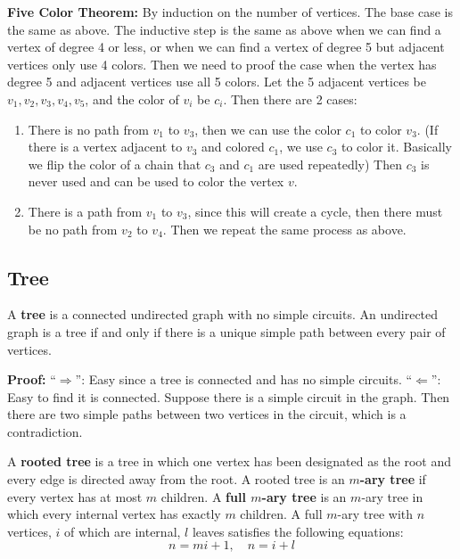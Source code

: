 \documentclass[a4paper,12pt]{article}
\begin{document}
\textbf{Five Color Theorem:}
By induction on the number of vertices.
The base case is the same as above.
The inductive step is the same as above when we can find a vertex of degree 4 or less, or when we can find a vertex of degree 5 but adjacent vertices only use 4 colors.
Then we need to proof the case when the vertex has degree 5 and adjacent vertices use all 5 colors.
Let the 5 adjacent vertices be $v_1, v_2, v_3, v_4, v_5$, and the color of $v_i$ be $c_i$.
Then there are 2 cases:
\begin{enumerate}
	\item There is no path from $v_1$ to $v_3$, then we can use the color $c_1$ to color $v_3$. (If there is a vertex adjacent to $v_3$ and colored $c_1$, we use $c_3$ to color it. Basically we flip the color of a chain that $c_3$ and $c_1$ are used repeatedly)
		Then $c_3$ is never used and can be used to color the vertex $v$.
	\item There is a path from $v_1$ to $v_3$, since this will create a cycle, then there must be no path from $v_2$ to $v_4$.
		Then we repeat the same process as above.
\end{enumerate}

\subsection{Tree}

A \textbf{tree} is a connected undirected graph with no simple circuits.
An undirected graph is a tree if and only if there is a unique simple path between every pair of vertices.

\textbf{Proof:}
``$\Rightarrow$'':
Easy since a tree is connected and has no simple circuits.
``$\Leftarrow$'':
Easy to find it is connected.
Suppose there is a simple circuit in the graph.
Then there are two simple paths between two vertices in the circuit, which is a contradiction.

A \textbf{rooted tree} is a tree in which one vertex has been designated as the root and every edge is directed away from the root.
A rooted tree is an \textbf{$m$-ary tree} if every vertex has at most $m$ children.
A \textbf{full $m$-ary tree} is an $m$-ary tree in which every internal vertex has exactly $m$ children.
A full $m$-ary tree with $n$ vertices, $i$ of which are internal, $l$ leaves satisfies the following equations:
\begin{equation*}
	n = mi + 1, \quad n = i + l
\end{equation*}
\end{document}

